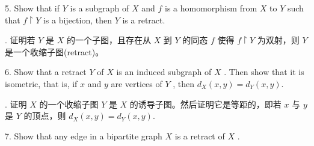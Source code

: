 \documentclass[10pt]{article}
\begin{document}
5. Show that if \(Y\) is a subgraph of \(X\) and \(f\) is a homomorphism from \(X\) to \(Y\) such that \(f \upharpoonright  Y\) is a bijection, then \(Y\) is a retract.

\begin{tcolorbox}. 证明若 \(Y\) 是 \(X\) 的一个子图，且存在从 \(X\) 到 \(Y\) 的同态 \(f\) 使得 \(f \upharpoonright  Y\) 为双射，则 \(Y\) 是一个收缩子图(retract)。
\end{tcolorbox}

6. Show that a retract \(Y\) of \(X\) is an induced subgraph of \(X\) . Then show that it is isometric, that is, if \(x\) and \(y\) are vertices of \(Y\) , then \({d}_{X}\left( {x,y}\right)  = {d}_{Y}\left( {x,y}\right) .\)

\begin{tcolorbox}. 证明 \(X\) 的一个收缩子图 \(Y\) 是 \(X\) 的诱导子图。然后证明它是等距的，即若 \(x\) 与 \(y\) 是 \(Y\) 的顶点，则 \({d}_{X}\left( {x,y}\right)  = {d}_{Y}\left( {x,y}\right) .\)
\end{tcolorbox}

7. Show that any edge in a bipartite graph \(X\) is a retract of \(X\) .
\end{document}
